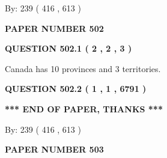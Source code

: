\documentclass[12pt]{article}
\begin{document}
   
\hspace{1.0in} By: 
 239 ( 416 ,  613 )
   
   
   
   
\newpage 
\setcounter{page}{ 
   502001 } 
   
   
   
   
 {\textbf{ \Large{ PAPER NUMBER  502  }}}
   
   
\vspace{0.2in}
   
   
   
   
   
   
 \vspace{0.2in}
 
 
 
 
   
   
  
\vspace{0.2in}
  
{\textbf{\Large{QUESTION
502.1 
 ( 2 , 2 , 3 )
}}}
  
  
 
 
\noindent{}
 
 
Canada has 10  provinces and 3 territories.
 
 
 
 
  
\vspace{0.2in}
  
{\textbf{\Large{QUESTION
502.2 
 ( 1 , 1 , 6791 )
}}}
  
  
   
   
 \vspace{0.2in}
 
   
   
   
   
\vspace{1.0in} 
{\textbf{\large{ *** END OF PAPER, THANKS *** }}} 
   
   
\hspace{1.0in} By: 
 239 ( 416 ,  613 )
   
   
   
   
\newpage 
\setcounter{page}{ 
   503001 } 
   
   
   
   
 {\textbf{ \Large{ PAPER NUMBER  503  }}}
   
\end{document}
